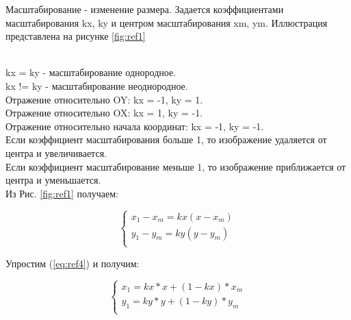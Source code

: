 Масштабирование - изменение размера. Задается коэффициентами масштабирования kx, ky и центром масштабирования xm, ym. Иллюстрация представлена на рисунке \ref{fig:ref1} \\
\begin{figure}[ht!]
\end{figure} 
\\
kx = ky - масштабирование однородное.\\
kx != ky - масштабирование неоднородное.\\
Отражение относительно OY: kx = -1, ky = 1.\\
Отражение относительно OX: kx = 1, ky = -1.\\
Отражение относительно начала координат: kx = -1, ky = -1.\\
Если коэффициент масштабирования больше 1, то изображение удаляется от центра и увеличивается.\\
Если коэффициент масштабирование меньше 1, то изображение приближается от центра и уменьшается.\\

Из Рис. \ref{fig:ref1} получаем:

\begin{equation}
{\begin{cases} 
	x_1 - x_m = kx(x - x_m)  \\
	y_1 - y_m = ky(y - y_m)  \\
	\label{eq:ref4}
	\end{cases}}
\end{equation}

Упростим (\ref{eq:ref4}) и получим: 

\begin{equation}
{\begin{cases} 
x_1 = kx * x + (1 - kx) * x_m \\
y_1 = ky * y + (1 - ky) * y_m \\
	\end{cases}}
\end{equation}

